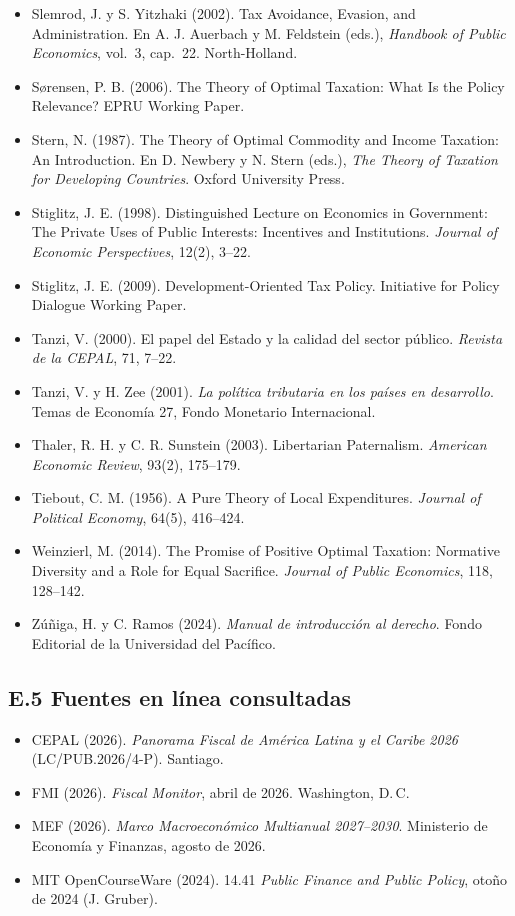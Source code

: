 \documentclass[11pt,a4paper]{article}
\begin{document}
{\begin{itemize}[leftmargin=1.4em,itemsep=1pt,label={}]
\item Slemrod, J. y S. Yitzhaki (2002). Tax Avoidance, Evasion, and Administration. En A. J. Auerbach y M. Feldstein (eds.), \emph{Handbook of Public Economics}, vol.~3, cap.~22. North-Holland.
\item Sørensen, P. B. (2006). The Theory of Optimal Taxation: What Is the Policy Relevance? EPRU Working Paper.
\item Stern, N. (1987). The Theory of Optimal Commodity and Income Taxation: An Introduction. En D. Newbery y N. Stern (eds.), \emph{The Theory of Taxation for Developing Countries}. Oxford University Press.
\item Stiglitz, J. E. (1998). Distinguished Lecture on Economics in Government: The Private Uses of Public Interests: Incentives and Institutions. \emph{Journal of Economic Perspectives}, 12(2), 3--22.
\item Stiglitz, J. E. (2009). Development-Oriented Tax Policy. Initiative for Policy Dialogue Working Paper.
\item Tanzi, V. (2000). El papel del Estado y la calidad del sector público. \emph{Revista de la CEPAL}, 71, 7--22.
\item Tanzi, V. y H. Zee (2001). \emph{La política tributaria en los países en desarrollo}. Temas de Economía 27, Fondo Monetario Internacional.
\item Thaler, R. H. y C. R. Sunstein (2003). Libertarian Paternalism. \emph{American Economic Review}, 93(2), 175--179.
\item Tiebout, C. M. (1956). A Pure Theory of Local Expenditures. \emph{Journal of Political Economy}, 64(5), 416--424.
\item Weinzierl, M. (2014). The Promise of Positive Optimal Taxation: Normative Diversity and a Role for Equal Sacrifice. \emph{Journal of Public Economics}, 118, 128--142.
\item Zúñiga, H. y C. Ramos (2024). \emph{Manual de introducción al derecho}. Fondo Editorial de la Universidad del Pacífico.
\end{itemize}
}

\subsection*{E.5 Fuentes en línea consultadas}
{\small
\begin{itemize}[leftmargin=1.4em,itemsep=1pt,label={}]
\item CEPAL (2026). \emph{Panorama Fiscal de América Latina y el Caribe 2026} (LC/PUB.2026/4-P). Santiago.
\item FMI (2026). \emph{Fiscal Monitor}, abril de 2026. Washington, D.\,C.
\item MEF (2026). \emph{Marco Macroeconómico Multianual 2027--2030}. Ministerio de Economía y Finanzas, agosto de 2026.
\item MIT OpenCourseWare (2024). 14.41 \emph{Public Finance and Public Policy}, otoño de 2024 (J. Gruber).
\end{itemize}
}
\end{document}
